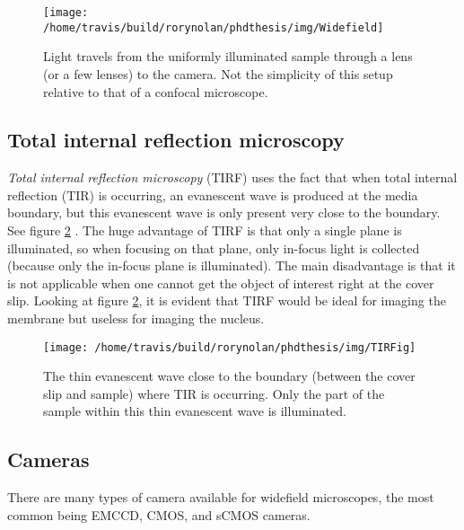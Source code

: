 \documentclass[12pt,]{book}
\theoremstyle{definition}
\theoremstyle{definition}
\theoremstyle{definition}
\theoremstyle{remark}
\begin{document}
\begin{figure}

\texttt{[image: /home/travis/build/rorynolan/phdthesis/img/Widefield]} \hfill{}

\caption{Light travels from the uniformly illuminated
sample through a lens (or a few lenses) to the camera. Not the
simplicity of this setup relative to that of a confocal microscope.}\label{fig:widefield}
\end{figure}

\subsection{Total internal reflection
microscopy}\label{total-internal-reflection-microscopy}

\emph{Total internal reflection microscopy} (TIRF) uses the fact that
when total internal reflection (TIR) is occurring, an evanescent wave is
produced at the media boundary, but this evanescent wave is only present
very close to the boundary. See figure \ref{fig:TIRFig} \citep{TIRFig}.
The huge advantage of TIRF is that only a single plane is illuminated,
so when focusing on that plane, only in-focus light is collected
(because only the in-focus plane is illuminated). The main disadvantage
is that it is not applicable when one cannot get the object of interest
right at the cover slip. Looking at figure \ref{fig:TIRFig}, it is
evident that TIRF would be ideal for imaging the membrane but useless
for imaging the nucleus.





\begin{figure}

\texttt{[image: /home/travis/build/rorynolan/phdthesis/img/TIRFig]} \hfill{}

\caption{The thin evanescent wave close to the boundary
(between the cover slip and sample) where TIR is occurring. Only the
part of the sample within this thin evanescent wave is illuminated.}\label{fig:TIRFig}
\end{figure}

\subsection{Cameras}\label{cameras}

There are many types of camera available for widefield microscopes, the
most common being EMCCD, CMOS, and sCMOS cameras.
\end{document}
